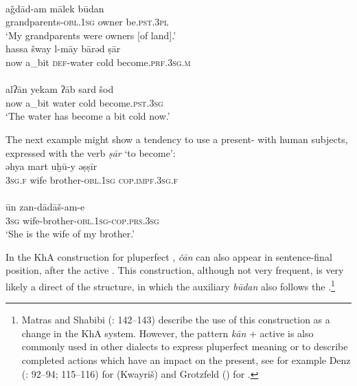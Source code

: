 \documentclass[output=paper,nonflat]{langsci/langscibook}
\begin{document}
\\
\gll aǧdād-am mālek būdan\\
     grandparents-\textsc{obl.1sg} owner be.\textsc{pst.3pl}\\
\glt ‘My grandparents were owners [of land].’
\z\z
\newpage
\ea\label{cold}
\\
\gll hassa šway l-māy bārəd ṣār\\
     now a\_bit \textsc{def}{}-water cold become.\textsc{prf.3sg.m}\\
 
\\
\gll alʔān yekam ʔāb sard šod\\
     now a\_bit water cold become.\textsc{pst}.\textsc{3sg}\\
\glt ‘The water has become a bit cold now.’
\z\z

The next example might show a tendency to use a present-  with human subjects, expressed with the verb \textit{ṣār} ‘to become’: 
\ea
{}\\
\gll əhya mart uḫū-y əṣṣīr\\
     3\textsc{sg.f} wife brother-\textsc{obl.1sg} \textsc{cop.impf.3sg.f}\\
 
\\
\gll ūn zan-dādāš-am-e\\
     3\textsc{sg} wife-brother-\textsc{obl.1sg}-\textsc{cop.prs.3sg}\\
\glt ‘She is the wife of my brother.’
\z\z


In the KhA construction for pluperfect , \textit{čān} can also appear in sentence-final position, after the active . This construction, although not very frequent, is very likely a direct  of the  structure, in which the auxiliary \textit{būdan} also follows the .\footnote{Matras and Shabibi (\citeyear{MatrasShabibi2007}: 142–143) describe the use of this construction as a change in the KhA  system. However, the pattern \textit{kān} + active  is also commonly used in other  dialects to express pluperfect meaning or to describe completed actions which have an impact on the present, see for example Denz (\citeyear{Denz1971}: 92–94; 115–116) for  (Kwayriš) and Grotzfeld (\citeyear[88]{Grotzfeld1965}) for  .} 
\end{document}
